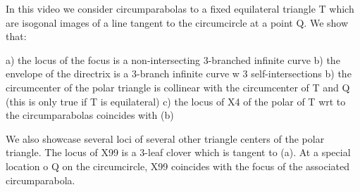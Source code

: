 In this video we consider circumparabolas to a fixed equilateral triangle T which are isogonal images of a line tangent to the circumcircle at a point Q. We show that:

a) the locus of the focus is a non-intersecting 3-branched infinite curve
b) the envelope of the directrix is a 3-branch infinite curve w 3 self-intersections
b) the circumcenter of the polar triangle is collinear with the circumcenter of T and Q (this is only true if T is equilateral)
c) the locus of X4 of the polar of T wrt to the circumparabolas coincides with (b)

We also showcase several loci of several other triangle centers of the polar triangle. The locus of X99 is a 3-leaf clover which is tangent to (a). At a special location o Q on the circumcircle, X99 coincides with the focus of the associated circumparabola.